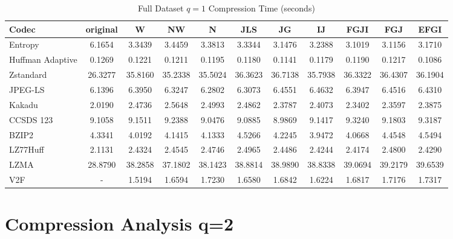 \documentclass{article}
\begin{document}
\begin{table}[h!]
    \centering
    \caption{Full Dataset $q=1$ Compression Time (seconds)}
    \begin{tabular}{|l|cccccccccc|}
        \hline
        Codec &  original &      W &     NW &      N &    JLS &     JG &     IJ &   FGJI &    FGJ &   EFGI \\ \hline
        Entropy &  6.1654 & 3.3439 & 3.4459 & 3.3813 & 3.3344 & 3.1476 & 3.2388 & 3.1019 & 3.1156 & 3.1710 \\ \hline
Huffman Adaptive                                &    0.1269 &  0.1221 &  0.1211 &  0.1195 &  0.1180 &  0.1141 &  0.1179 &  0.1190 &  0.1217 &  0.1086 \\
Zstandard                              &   26.3277 & 35.8160 & 35.2338 & 35.5024 & 36.3623 & 36.7138 & 35.7938 & 36.3322 & 36.4307 & 36.1904 \\
JPEG-LS                                &    6.1396 &  6.3950 &  6.3247 &  6.2802 &  6.3073 &  6.4551 &  6.4632 &  6.3947 &  6.4516 &  6.4310 \\
Kakadu                        &    2.0190 &  2.4736 &  2.5648 &  2.4993 &  2.4862 &  2.3787 &  2.4073 &  2.3402 &  2.3597 &  2.3875 \\
CCSDS 123 &    9.1058 &  9.1511 &  9.2388 &  9.0476 &  9.0885 &  8.9869 &  9.1417 &  9.3240 &  9.1803 &  9.3187 \\
BZIP2                              &    4.3341 &  4.0192 &  4.1415 &  4.1333 &  4.5266 &  4.2245 &  3.9472 &  4.0668 &  4.4548 &  4.5494 \\
LZ77Huff                          &    2.1131 &  2.4324 &  2.4545 &  2.4746 &  2.4965 &  2.4486 &  2.4244 &  2.4174 &  2.4800 &  2.4290 \\
LZMA                              &   28.8790 & 38.2858 & 37.1802 & 38.1423 & 38.8814 & 38.9890 & 38.8338 & 39.0694 & 39.2179 & 39.6539 \\
V2F                  &    - &  1.5194 &  1.6594 &  1.7230 &  1.6580 &  1.6842 &  1.6224 &  1.6817 &  1.7176 &  1.7317 \\
        \hline
    \end{tabular}
\end{table}

\newpage
\section{Compression Analysis q=2}
\end{document}
